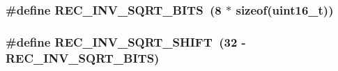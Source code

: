 \subsubsection[{\texorpdfstring{R\+E\+C\+\_\+\+I\+N\+V\+\_\+\+S\+Q\+R\+T\+\_\+\+B\+I\+TS}{REC_INV_SQRT_BITS}}]{\setlength{\rightskip}{0pt plus 5cm}\#define R\+E\+C\+\_\+\+I\+N\+V\+\_\+\+S\+Q\+R\+T\+\_\+\+B\+I\+TS~(8 $\ast$ sizeof(uint16\+\_\+t))}\hypertarget{codel-queue-disc_8h_a594de71aa3f8f20c5d7da6b21a16018f}{}\label{codel-queue-disc_8h_a594de71aa3f8f20c5d7da6b21a16018f}
\subsubsection[{\texorpdfstring{R\+E\+C\+\_\+\+I\+N\+V\+\_\+\+S\+Q\+R\+T\+\_\+\+S\+H\+I\+FT}{REC_INV_SQRT_SHIFT}}]{\setlength{\rightskip}{0pt plus 5cm}\#define R\+E\+C\+\_\+\+I\+N\+V\+\_\+\+S\+Q\+R\+T\+\_\+\+S\+H\+I\+FT~(32 -\/ {\bf R\+E\+C\+\_\+\+I\+N\+V\+\_\+\+S\+Q\+R\+T\+\_\+\+B\+I\+TS})}\hypertarget{codel-queue-disc_8h_afe1531f0000cbbe8e10e4905c0e5dfa0}{}\label{codel-queue-disc_8h_afe1531f0000cbbe8e10e4905c0e5dfa0}
